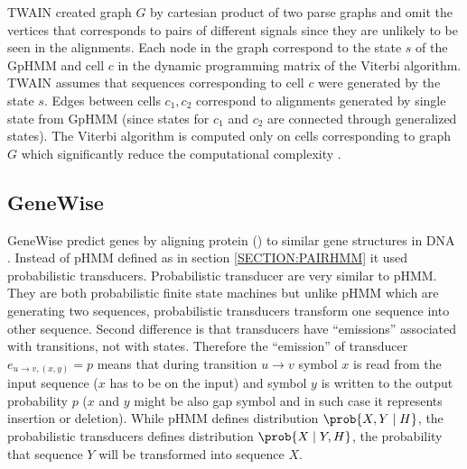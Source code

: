 TWAIN created graph $G$ by cartesian product of two parse graphs and omit the
vertices that corresponds to pairs of different signals since they are unlikely
to be seen in the alignments. Each node in the graph correspond to the state $s$
of the GpHMM and cell $c$ in the dynamic programming matrix of the Viterbi
algorithm. TWAIN assumes that sequences corresponding to cell $c$ were generated
by the state $s$.  Edges between cells $c_1,c_2$ correspond to alignments
generated by single state from GpHMM (since states for $c_1$ and $c_2$ are
connected through generalized states).  The Viterbi algorithm is computed only
on cells corresponding to graph $G$ which significantly reduce the computational
complexity \cite{Majoros2005}.

%
%

\subsection{GeneWise}

GeneWise predict genes by aligning protein () to similar gene structures in DNA
\cite{GeneWise2004}. Instead of pHMM defined as in section \ref{SECTION:PAIRHMM}
it used probabilistic transducers. Probabilistic transducer are very similar to
pHMM. They are both probabilistic finite state machines but unlike pHMM which
are generating two sequences, probabilistic transducers transform one sequence
into other sequence.  Second difference is that transducers have ``emissions''
associated with transitions, not with states.  Therefore the ``emission'' of
transducer $e_{u\to v,(x,y)}=p$ means that during transition $u\to v$ symbol $x$
is read from the input sequence ($x$ has to be on the input) and symbol $y$ is
written to the output probability $p$ ($x$ and $y$ might be also gap symbol and
in such case it represents insertion or deletion).  While pHMM defines
distribution $\prob{X,Y\mid H}$, the probabilistic transducers defines
distribution $\prob{X\mid Y,H}$, the probability that sequence $Y$ will be
transformed into sequence $X$.

